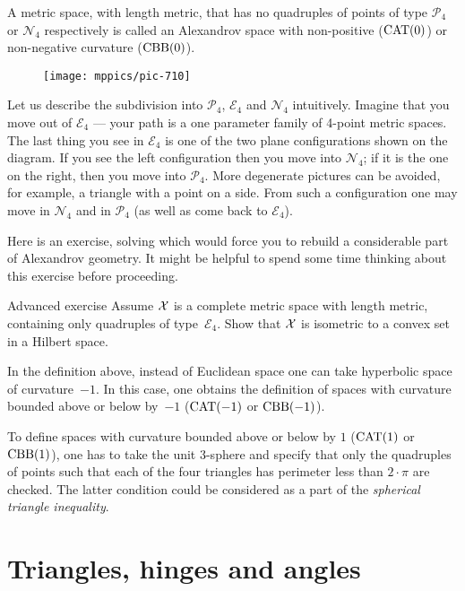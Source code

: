 A metric space, with length metric, 
that has no quadruples of points of type $\mathcal{P}_4$ or $\mathcal{N}_4$
respectively 
is called an Alexandrov space with non-positive ($\mathrm{CAT}(0)$) or non-negative curvature ($\mathrm{CBB}(0)$).

\begin{wrapfigure}{r}{33mm}
\vskip-4mm
\centering
\texttt{[image: mppics/pic-710]}
\end{wrapfigure}

Let us describe the subdivision into  $\mathcal{P}_4$, $\mathcal{E}_4$ and $\mathcal{N}_4$ intuitively.
Imagine that you move out of $\mathcal{E}_4$ --- your path is a one parameter family of 4-point metric spaces.
The last thing you see in $\mathcal{E}_4$ is one of the two plane configurations shown on the diagram.
If you see the left configuration then you move into $\mathcal{N}_4$;
if it is the one on the right, then you move into $\mathcal{P}_4$.
More degenerate pictures can be avoided, for example, a triangle with a point on a side.
From such a configuration one may move in $\mathcal{N}_4$ and in $\mathcal{P}_4$ (as well as come back to $\mathcal{E}_4$).

Here is an exercise, solving which would force you to rebuild a considerable part of Alexandrov geometry.
It might be helpful to spend some time thinking about this exercise before proceeding.

\begin{thm}{Advanced exercise}\label{ex:convex-set}
Assume $\mathcal{X}$ is a complete metric space with length metric, 
containing only quadruples of type~$\mathcal{E}_4$.
Show that $\mathcal{X}$ is isometric to a convex set in a Hilbert space.
\end{thm}

In the definition above, 
instead of  Euclidean space 
one can take  
hyperbolic space of curvature~$-1$.
In this case,
one obtains the definition of spaces with curvature bounded above or below by~$-1$ ($\mathrm{CAT}(-1)$ or $\mathrm{CBB}(-1)$).

To define spaces with curvature bounded above or below by $1$ ($\mathrm{CAT}(1)$ or $\mathrm{CBB}(1)$),
one has to take the unit 3-sphere 
and specify that only the quadruples of points such that each of the four triangles has perimeter 
less than $2\cdot\pi$ are checked.
The latter condition could be considered as a part of the {}\emph{spherical triangle inequality}.

\section{Triangles, hinges and angles}

